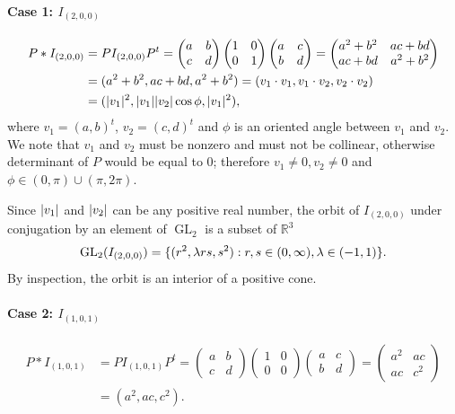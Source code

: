 \documentclass{article}
\theoremstyle{definition}
\newcommand{\R}{\mathbb{R}}
\newcommand{\GL}{\operatorname{GL}}
\DeclarePairedDelimiter\set{\{}{\}}
\DeclarePairedDelimiter\abs{\lvert}{\rvert}
\begin{document}
\paragraph{Case 1: $I_{(2,0,0)}$}

\begin{align*}
	P * I_{(2,0,0)} & =
	P I_{(2,0,0)} P^t =
	\begin{pmatrix}
		a & b \\
		c & d
	\end{pmatrix}
	\begin{pmatrix}
		1 & 0 \\
		0 & 1
	\end{pmatrix}
	\begin{pmatrix}
		a & c \\
		b & d
	\end{pmatrix}
	=
	\begin{pmatrix}
		a^2+b^2 & ac+bd \\
		ac+bd & a^2+b^2
	\end{pmatrix}
	\\
	& = (a^2+b^2, ac+bd, a^2+b^2)
	= (v_1 \cdot v_1, v_1 \cdot v_2, v_2 \cdot v_2)
	\\
	& = (\abs{v_1}^2, \abs{v_1}\abs{v_2}\cos\phi, \abs{v_1}^2),
\end{align*}
where $v_1 = (a,b)^t$, $v_2 = (c,d)^t$ and $\phi$ is an oriented angle between $v_1$ and $v_2$.
We note that $v_1$ and $v_2$ must be nonzero and must not be collinear, otherwise determinant of $P$ would be equal to $0$; therefore $v_1 \neq 0, v_2 \neq 0$ and $\phi \in (0,\pi) \cup (\pi, 2\pi)$.

Since $\abs{v_1}$ and $\abs{v_2}$ can be any positive real number, the orbit of $I_{(2,0,0)}$ under conjugation by an element of $\GL_2$ is a subset of $\R^3$
\[
	\GL_2 (I_{(2,0,0)}) = \set{(r^2, \lambda rs, s^2): r,s \in (0, \infty), \lambda \in (-1,1)}.
\]
By inspection, the orbit is an interior of a positive cone. 

\paragraph{Case 2: $I_{(1,0,1)}$}

\begin{align*}
	P * I_{(1,0,1)} & =
	P I_{(1,0,1)} P^t =
	\begin{pmatrix}
		a & b \\
		c & d
	\end{pmatrix}
	\begin{pmatrix}
		1 & 0 \\
		0 & 0
	\end{pmatrix}
	\begin{pmatrix}
		a & c \\
		b & d
	\end{pmatrix}
	=
	\begin{pmatrix}
		a^2 & ac \\
		ac & c^2
	\end{pmatrix}
	\\
	& = (a^2, ac, c^2).
\end{align*}
\end{document}
